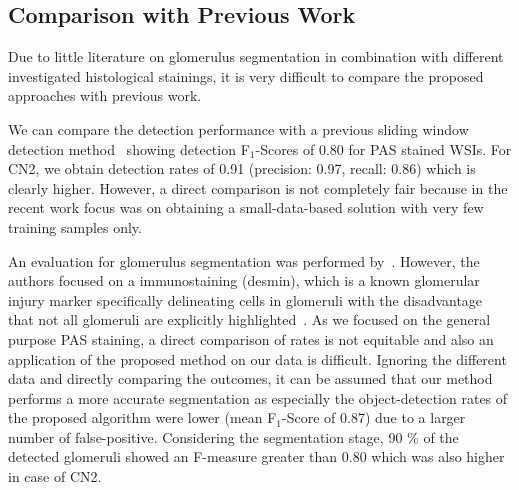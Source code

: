 \documentclass{elsarticle}
\begin{document}
\subsection{Comparison with Previous Work}
Due to little literature on glomerulus segmentation in combination with different investigated histological stainings, it is very difficult to compare the proposed approaches with previous work.

We can compare the detection performance with a previous sliding window detection method~\citep{Gadermayr16f} showing detection F$_1$-Scores of 0.80 for PAS stained WSIs. For CN2, we obtain detection rates of 0.91 (precision: 0.97, recall: 0.86) which is clearly higher. However, a direct comparison is not completely fair because in the recent work focus was on obtaining a small-data-based solution with very few training samples only.

An evaluation for glomerulus segmentation was performed by~\cite{myKato15a}. However, the authors focused on a immunostaining (desmin), which is a known glomerular injury marker specifically delineating cells in glomeruli with the disadvantage that not all glomeruli are explicitly highlighted~\citep{myKato15a}. As we focused on the general purpose PAS staining, a direct comparison of rates is not  equitable and also an application of the proposed method on our data is difficult.
Ignoring the different data and directly comparing the outcomes, it can be assumed that our method performs a more accurate segmentation as especially the object-detection rates of the proposed algorithm were lower (mean F$_1$-Score of 0.87) due to a larger number of false-positive. 
Considering the segmentation stage, 90 \% of the detected glomeruli showed an F-measure greater than 0.80 which was also higher in case of CN2.
\end{document}
